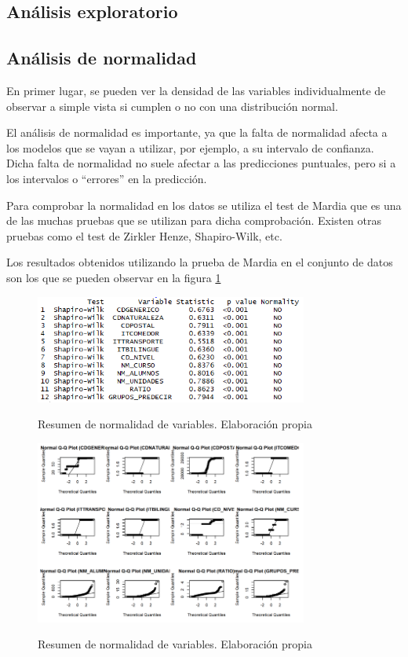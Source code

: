 \begin{subappendices}
\section{Análisis exploratorio}

\subsection{Análisis de normalidad}
\label{appendix:AB1}
En primer lugar, se pueden ver la densidad de las variables individualmente de observar a simple vista si cumplen o no con una distribución normal. 

El análisis de normalidad es importante, ya que la falta de normalidad afecta a los modelos que se vayan a utilizar, por ejemplo, a su intervalo de confianza. Dicha falta de normalidad no suele afectar a las predicciones puntuales, pero si a los intervalos o ``errores'' en la predicción.

Para comprobar la normalidad en los datos se utiliza el test de Mardia que es una de las muchas pruebas que se utilizan para dicha comprobación. Existen otras pruebas como el test de Zirkler Henze, Shapiro-Wilk, etc.

Los resultados obtenidos utilizando la prueba de Mardia en el conjunto de datos son los que se pueden observar en la figura \ref{fig:normalidadSUM}

\begin{figure}[htb]
	\centering
	\caption{Resumen de normalidad de variables. Elaboración propia}
	\includegraphics[width=0.8\textwidth]{recursos/ImagenesR/normalidadSUM}
	\label{fig:normalidadSUM}
\end{figure}
\FloatBarrier


\begin{figure}[htb]
	\centering
	\caption{Resumen de normalidad de variables. Elaboración propia}
	\includegraphics[width=0.8\textwidth]{recursos/ImagenesR/normalidadGRAF}
	\label{fig:normalidadGRAF}
\end{figure}
\FloatBarrier


\end{subappendices}
